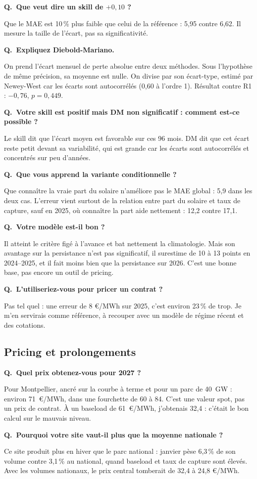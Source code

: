 \documentclass[11pt,a4paper]{article}
\newcounter{qr}
\newcommand{\qr}[2]{\stepcounter{qr}\par\medskip\noindent\textbf{Q\theqr.\ #1}\par\nopagebreak\noindent #2\par}
\begin{document}
\qr{Que veut dire un skill de $+0{,}10$ ?}{Que le MAE est 10\,\% plus faible que celui de la référence : 5,95 contre 6,62. Il mesure la taille de l'écart, pas sa significativité.}

\qr{Expliquez Diebold-Mariano.}{On prend l'écart mensuel de perte absolue entre deux méthodes. Sous l'hypothèse de même précision, sa moyenne est nulle. On divise par son écart-type, estimé par Newey-West car les écarts sont autocorrélés (0,60 à l'ordre 1). Résultat contre R1 : $-0{,}76$, $p = 0{,}449$.}

\qr{Votre skill est positif mais DM non significatif : comment est-ce possible ?}{Le skill dit que l'écart moyen est favorable sur ces 96 mois. DM dit que cet écart reste petit devant sa variabilité, qui est grande car les écarts sont autocorrélés et concentrés sur peu d'années.}

\qr{Que vous apprend la variante conditionnelle ?}{Que connaître la vraie part du solaire n'améliore pas le MAE global : 5,9 dans les deux cas. L'erreur vient surtout de la relation entre part du solaire et taux de capture, sauf en 2025, où connaître la part aide nettement : 12,2 contre 17,1.}

\qr{Votre modèle est-il bon ?}{Il atteint le critère figé à l'avance et bat nettement la climatologie. Mais son avantage sur la persistance n'est pas significatif, il surestime de 10 à 13 points en 2024--2025, et il fait moins bien que la persistance sur 2026. C'est une bonne base, pas encore un outil de pricing.}

\qr{L'utiliseriez-vous pour pricer un contrat ?}{Pas tel quel : une erreur de 8 €/MWh sur 2025, c'est environ 23\,\% de trop. Je m'en servirais comme référence, à recouper avec un modèle de régime récent et des cotations.}

\subsection{Pricing et prolongements}

\qr{Quel prix obtenez-vous pour 2027 ?}{Pour Montpellier, ancré sur la courbe à terme et pour un parc de 40~GW : environ 71~€/MWh, dans une fourchette de 60 à 84. C'est une valeur spot, pas un prix de contrat. À un baseload de 61~€/MWh, j'obtenais 32,4 : c'était le bon calcul sur le mauvais niveau.}

\qr{Pourquoi votre site vaut-il plus que la moyenne nationale ?}{Ce site produit plus en hiver que le parc national : janvier pèse 6,3\,\% de son volume contre 3,1\,\% au national, quand baseload et taux de capture sont élevés. Avec les volumes nationaux, le prix central tomberait de 32,4 à 24,8 €/MWh.}
\end{document}
